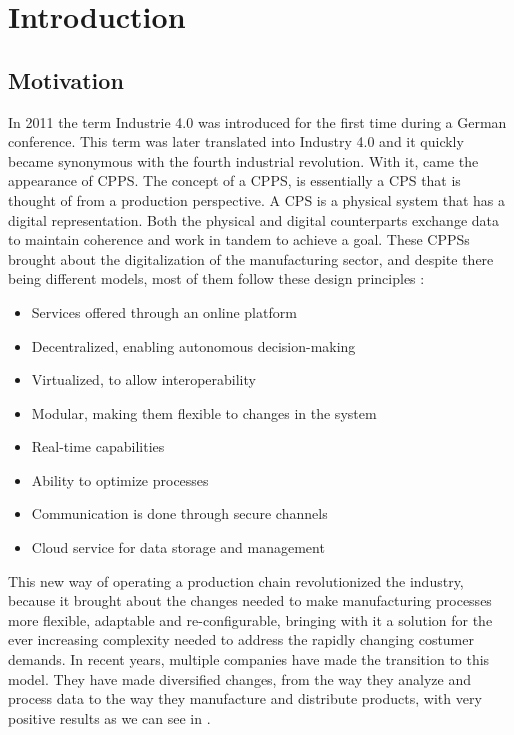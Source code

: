 

\chapter{Introduction}
\label{cha:introduction}

\section{Motivation}
\label{sec:motivation}

In 2011 the term Industrie 4.0 was introduced for the first time during a German conference. This term was later translated into Industry 4.0 and it quickly became synonymous with the fourth industrial revolution. With it, came the appearance of \gls{CPPS}. The concept of a \gls{CPPS}, is essentially a \gls{CPS} that is thought of from a production perspective. A \gls{CPS} is a physical system that has a digital representation. Both the physical and digital counterparts exchange data to maintain coherence and work in tandem to achieve a goal. These \gls{CPPS}s brought about the digitalization of the manufacturing sector, and despite there being different models, most of them follow these design principles \cite{birgit01}:

\begin{itemize}
	\item Services offered through an online platform
	\item Decentralized, enabling autonomous decision-making
	\item Virtualized, to allow interoperability
	\item Modular, making them flexible to changes in the system
	\item Real-time capabilities
	\item Ability to optimize processes
	\item Communication is done through secure channels
	\item Cloud service for data storage and management
\end{itemize}

This new way of operating a production chain revolutionized the industry, because it brought about the changes needed to make manufacturing processes more flexible, adaptable and re-configurable, bringing with it a solution for the ever increasing complexity needed to address the rapidly changing costumer demands.
In recent years, multiple companies have made the transition to this model. They have made diversified changes, from the way they analyze and process data to the way they manufacture and distribute products, with very positive results as we can see in \cite{rit01}. \\

